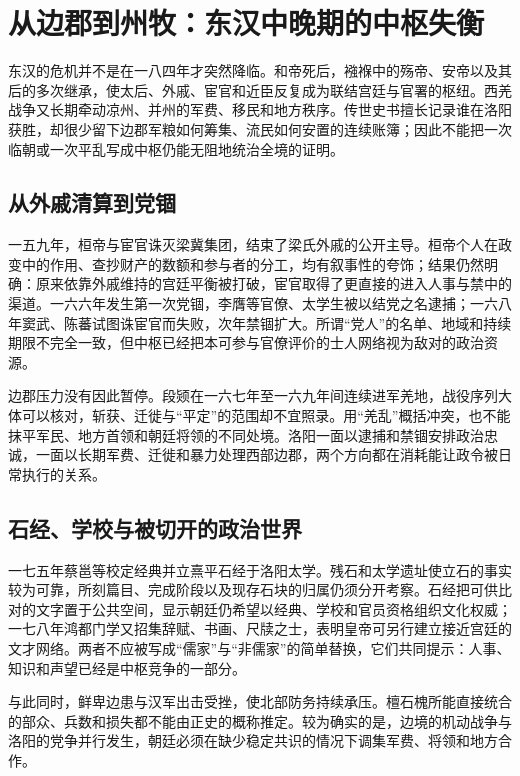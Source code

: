 \section{从边郡到州牧：东汉中晚期的中枢失衡}
\label{sec:eastern-han-middle-late-crises}

东汉的危机并不是在一八四年才突然降临。和帝死后，襁褓中的殇帝、安帝以及其后的多次继承，使太后、外戚、宦官和近臣反复成为联结宫廷与官署的枢纽。西羌战争又长期牵动凉州、并州的军费、移民和地方秩序。传世史书擅长记录谁在洛阳获胜，却很少留下边郡军粮如何筹集、流民如何安置的连续账簿；因此不能把一次临朝或一次平乱写成中枢仍能无阻地统治全境的证明。

\subsection{从外戚清算到党锢}

一五九年，桓帝与宦官诛灭梁冀集团，结束了梁氏外戚的公开主导。桓帝个人在政变中的作用、查抄财产的数额和参与者的分工，均有叙事性的夸饰；结果仍然明确：原来依靠外戚维持的宫廷平衡被打破，宦官取得了更直接的进入人事与禁中的渠道。一六六年发生第一次党锢，李膺等官僚、太学生被以结党之名逮捕；一六八年窦武、陈蕃试图诛宦官而失败，次年禁锢扩大。所谓“党人”的名单、地域和持续期限不完全一致，但中枢已经把本可参与官僚评价的士人网络视为敌对的政治资源。

边郡压力没有因此暂停。段颎在一六七年至一六九年间连续进军羌地，战役序列大体可以核对，斩获、迁徙与“平定”的范围却不宜照录。用“羌乱”概括冲突，也不能抹平军民、地方首领和朝廷将领的不同处境。洛阳一面以逮捕和禁锢安排政治忠诚，一面以长期军费、迁徙和暴力处理西部边郡，两个方向都在消耗能让政令被日常执行的关系。

\subsection{石经、学校与被切开的政治世界}

一七五年蔡邕等校定经典并立熹平石经于洛阳太学。残石和太学遗址使立石的事实较为可靠，所刻篇目、完成阶段以及现存石块的归属仍须分开考察。石经把可供比对的文字置于公共空间，显示朝廷仍希望以经典、学校和官员资格组织文化权威；一七八年鸿都门学又招集辞赋、书画、尺牍之士，表明皇帝可另行建立接近宫廷的文才网络。两者不应被写成“儒家”与“非儒家”的简单替换，它们共同提示：人事、知识和声望已经是中枢竞争的一部分。

与此同时，鲜卑边患与汉军出击受挫，使北部防务持续承压。檀石槐所能直接统合的部众、兵数和损失都不能由正史的概称推定。较为确实的是，边境的机动战争与洛阳的党争并行发生，朝廷必须在缺少稳定共识的情况下调集军费、将领和地方合作。

